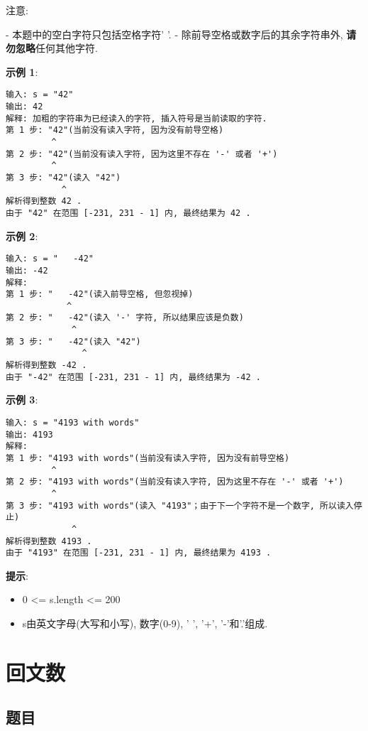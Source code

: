 \documentclass[oneside]{ctexbook}
\begin{document}
注意: 

- 本题中的空白字符只包括空格字符' '. 
- 除前导空格或数字后的其余字符串外, \textbf{请勿忽略}任何其他字符. 

\textbf{示例 1}: 

\begin{verbatim}
输入: s = "42"
输出: 42
解释: 加粗的字符串为已经读入的字符, 插入符号是当前读取的字符. 
第 1 步: "42"(当前没有读入字符, 因为没有前导空格)
         ^
第 2 步: "42"(当前没有读入字符, 因为这里不存在 '-' 或者 '+')
         ^
第 3 步: "42"(读入 "42")
           ^
解析得到整数 42 . 
由于 "42" 在范围 [-231, 231 - 1] 内, 最终结果为 42 . 
\end{verbatim}

\textbf{示例 2}: 

\begin{verbatim}
输入: s = "   -42"
输出: -42
解释: 
第 1 步: "   -42"(读入前导空格, 但忽视掉)
            ^
第 2 步: "   -42"(读入 '-' 字符, 所以结果应该是负数)
             ^
第 3 步: "   -42"(读入 "42")
               ^
解析得到整数 -42 . 
由于 "-42" 在范围 [-231, 231 - 1] 内, 最终结果为 -42 . 
\end{verbatim}

\textbf{示例 3}: 

\begin{verbatim}
输入: s = "4193 with words"
输出: 4193
解释: 
第 1 步: "4193 with words"(当前没有读入字符, 因为没有前导空格)
         ^
第 2 步: "4193 with words"(当前没有读入字符, 因为这里不存在 '-' 或者 '+')
         ^
第 3 步: "4193 with words"(读入 "4193"；由于下一个字符不是一个数字, 所以读入停止)
             ^
解析得到整数 4193 . 
由于 "4193" 在范围 [-231, 231 - 1] 内, 最终结果为 4193 . 
\end{verbatim}

\textbf{提示}:

\begin{itemize}
    \item 0 <= s.length <= 200
    \item s由英文字母(大写和小写), 数字(0-9), ' ', '+', '-'和'.'组成.
\end{itemize}

\chapter{回文数}

\section{题目}
\end{document}
